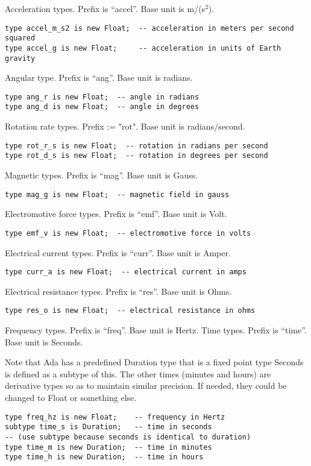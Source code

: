 \documentclass[10pt, openany]{book}
\begin{document}
Acceleration types.  Prefix is ``accel''.  Base unit is m/(s$^2$).
\begin{lstlisting}
type accel_m_s2 is new Float;  -- acceleration in meters per second squared
type accel_g is new Float;     -- acceleration in units of Earth gravity
\end{lstlisting}
Angular type.  Prefix is ``ang''.  Base unit is radians.
\begin{lstlisting}
type ang_r is new Float;  -- angle in radians
type ang_d is new Float;  -- angle in degrees
\end{lstlisting}
Rotation rate types.  Prefix := "rot".  Base unit is radians/second.
\begin{lstlisting}
type rot_r_s is new Float;  -- rotation in radians per second
type rot_d_s is new Float;  -- rotation in degrees per second
\end{lstlisting}
Magnetic types.  Prefix is ``mag''.  Base unit is Gauss.
\begin{lstlisting}
type mag_g is new Float;  -- magnetic field in gauss
\end{lstlisting}
Electromotive force types.  Prefix is ``emf''.  Base unit is Volt.
\begin{lstlisting}
type emf_v is new Float;  -- electromotive force in volts
\end{lstlisting}
Electrical current types.  Prefix is ``curr''.  Base unit is Amper.
\begin{lstlisting}
type curr_a is new Float;  -- electrical current in amps
\end{lstlisting}
Electrical resistance types.  Prefix is ``res''.  Base unit is Ohms.
\begin{lstlisting}
type res_o is new Float;  -- electrical resistance in ohms
\end{lstlisting}
Frequency types.  Prefix is ``freq''.  Base unit is Hertz.  Time types. Prefix is ``time''.  Base unit is Seconds.

Note that Ada has a predefined Duration type that is a fixed point type Seconds is defined as a subtype of this.  The other times (minutes and hours) are derivative types so as to maintain similar precision.  If needed, they could be changed to Float or something else.
\begin{lstlisting}
type freq_hz is new Float;    -- frequency in Hertz
subtype time_s is Duration;   -- time in seconds
-- (use subtype because seconds is identical to duration)
type time_m is new Duration;  -- time in minutes
type time_h is new Duration;  -- time in hours
\end{lstlisting}
\end{document}

